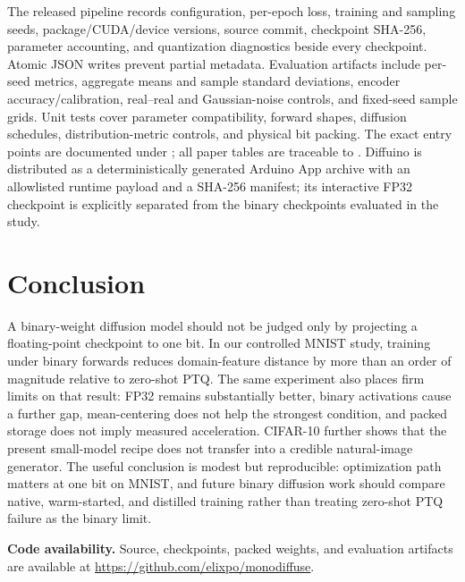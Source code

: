 \documentclass[conference]{IEEEtran}
\begin{document}
The released pipeline records configuration, per-epoch loss, training and sampling
seeds, package/CUDA/device versions, source commit, checkpoint SHA-256, parameter
accounting, and quantization diagnostics beside every checkpoint. Atomic JSON
writes prevent partial metadata. Evaluation artifacts include per-seed metrics,
aggregate means and sample standard deviations, encoder accuracy/calibration,
real--real and Gaussian-noise controls, and fixed-seed sample grids. Unit tests
cover parameter compatibility, forward shapes, diffusion schedules,
distribution-metric controls, and physical bit packing. The exact entry points
are documented under ; all paper tables are
traceable to . Diffuino is distributed as a
deterministically generated Arduino App archive with an allowlisted runtime
payload and a SHA-256 manifest; its interactive FP32 checkpoint is explicitly
separated from the binary checkpoints evaluated in the study.

\section{Conclusion}

A binary-weight diffusion model should not be judged only by projecting a
floating-point checkpoint to one bit. In our controlled MNIST study, training
under binary forwards reduces domain-feature distance by more than an order of
magnitude relative to zero-shot PTQ. The same experiment also places firm limits
on that result: FP32 remains substantially better, binary activations cause a
further gap, mean-centering does not help the strongest condition, and packed
storage does not imply measured acceleration. CIFAR-10 further shows that the
present small-model recipe does not transfer into a credible natural-image
generator. The useful conclusion is modest but reproducible: optimization path
matters at one bit on MNIST, and future binary
diffusion work should compare native, warm-started, and distilled training rather
than treating zero-shot PTQ failure as the binary limit.

\smallskip\noindent\textbf{Code availability.}
Source, checkpoints, packed weights, and evaluation artifacts are available at
\url{https://github.com/elixpo/monodiffuse}.



\end{document}
